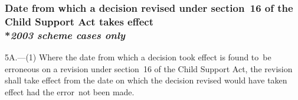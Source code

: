 \documentclass[12pt,a4paper]{article}
\begin{document}

\subsubsection[5A. Date from which a decision revised under section~16 of the Child Support Act takes effect]{Date from which a decision revised under section~16 of the Child Support Act takes effect\\*\emph{2003 scheme cases only}}

5A.---(1)  Where the date from which a decision took effect is found to~be erroneous on a revision under section~16 of the Child Support Act, the revision shall take effect from the date on which the decision revised would have taken effect had the error~not been made.
\end{document}
